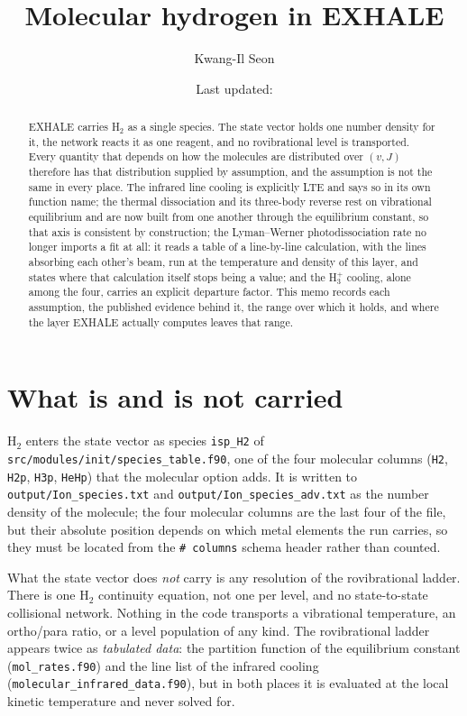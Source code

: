 \documentclass[english,a4paper]{my_memo}
\title{Molecular hydrogen in EXHALE}
\author{Kwang-Il Seon}
\date{Last updated: \docmoddate}
\begin{document}
\maketitle

\begin{abstract}
EXHALE carries H$_2$ as a single species. The state vector holds one number
density for it, the network reacts it as one reagent, and no rovibrational
level is transported. Every quantity that depends on how the molecules are
distributed over $(v,J)$ therefore has that distribution supplied by
assumption, and the assumption is not the same in every place. The infrared
line cooling is explicitly LTE and says so in its own function name; the
thermal dissociation and its three-body reverse rest on vibrational
equilibrium and are now built from one another through the equilibrium
constant, so that axis is consistent by construction; the Lyman--Werner
photodissociation rate no longer imports a fit at all: it reads a table of a
line-by-line calculation, with the lines absorbing each other's beam, run at
the temperature and density of this layer, and states where that calculation
itself stops being a value; and the H$_3^+$
cooling, alone among the four, carries an explicit departure factor. This memo
records each assumption, the published evidence behind it, the range over which
it holds, and where the layer EXHALE actually computes leaves that range.
\end{abstract}

\section{What is and is not carried}

H$_2$ enters the state vector as species \texttt{isp\_H2} of
\texttt{src/modules/init/species\_table.f90}, one of the four molecular
columns (\texttt{H2}, \texttt{H2p}, \texttt{H3p}, \texttt{HeHp}) that the
molecular option adds. It is written to \texttt{output/Ion\_species.txt}
and \texttt{output/Ion\_species\_adv.txt} as the number density of the
molecule; the four molecular columns are the last four of the file, but their
absolute position depends on which metal elements the run carries, so they
must be located from the \texttt{\# columns} schema header rather than
counted.

What the state vector does \emph{not} carry is any resolution of the
rovibrational ladder. There is one H$_2$ continuity equation, not one per
level, and no state-to-state collisional network. Nothing in the code
transports a vibrational temperature, an ortho/para ratio, or a level
population of any kind. The rovibrational ladder appears twice as
\emph{tabulated data}: the partition function of the equilibrium constant
(\texttt{mol\_rates.f90}) and the line list of the infrared cooling
(\texttt{molecular\_infrared\_data.f90}), but in both places it is
evaluated at the local kinetic temperature and never solved for.
\end{document}
